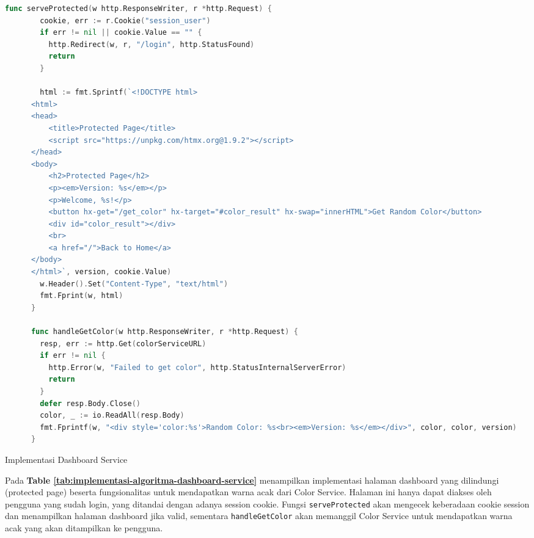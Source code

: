\begin{table}[H]
  \centering
  \begin{minipage}{0.95\linewidth}
    \begin{lstlisting}[language=go, basicstyle=\footnotesize\ttfamily]
      func serveProtected(w http.ResponseWriter, r *http.Request) {
        cookie, err := r.Cookie("session_user")
        if err != nil || cookie.Value == "" {
          http.Redirect(w, r, "/login", http.StatusFound)
          return
        }
      
        html := fmt.Sprintf(`<!DOCTYPE html>
      <html>
      <head>
          <title>Protected Page</title>
          <script src="https://unpkg.com/htmx.org@1.9.2"></script>
      </head>
      <body>
          <h2>Protected Page</h2>
          <p><em>Version: %s</em></p>
          <p>Welcome, %s!</p>
          <button hx-get="/get_color" hx-target="#color_result" hx-swap="innerHTML">Get Random Color</button>
          <div id="color_result"></div>
          <br>
          <a href="/">Back to Home</a>
      </body>
      </html>`, version, cookie.Value)
        w.Header().Set("Content-Type", "text/html")
        fmt.Fprint(w, html)
      }
      
      func handleGetColor(w http.ResponseWriter, r *http.Request) {
        resp, err := http.Get(colorServiceURL)
        if err != nil {
          http.Error(w, "Failed to get color", http.StatusInternalServerError)
          return
        }
        defer resp.Body.Close()
        color, _ := io.ReadAll(resp.Body)
        fmt.Fprintf(w, "<div style='color:%s'>Random Color: %s<br><em>Version: %s</em></div>", color, color, version)
      }
    \end{lstlisting}
  \end{minipage}
  \caption{Implementasi Dashboard Service}
  \label{tab:implementasi-algoritma-dashboard-service}
\end{table}

Pada \textbf{Table \ref{tab:implementasi-algoritma-dashboard-service}}
menampilkan implementasi halaman dashboard yang dilindungi (protected page)
beserta fungsionalitas untuk mendapatkan warna acak dari Color Service. Halaman
ini hanya dapat diakses oleh pengguna yang sudah login, yang ditandai dengan
adanya session cookie. Fungsi \texttt{serveProtected} akan mengecek keberadaan
cookie session dan menampilkan halaman dashboard jika valid, sementara
\texttt{handleGetColor} akan memanggil Color Service untuk mendapatkan warna
acak yang akan ditampilkan ke pengguna.

